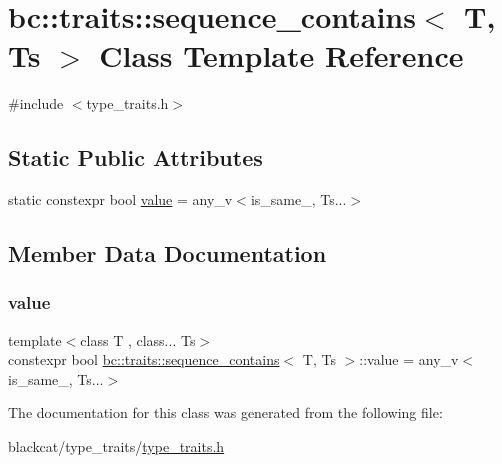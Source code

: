 \hypertarget{classbc_1_1traits_1_1sequence__contains}{}\section{bc\+:\+:traits\+:\+:sequence\+\_\+contains$<$ T, Ts $>$ Class Template Reference}
\label{classbc_1_1traits_1_1sequence__contains}


{\ttfamily \#include $<$type\+\_\+traits.\+h$>$}

\subsection*{Static Public Attributes}
\begin{DoxyCompactItemize}
\item 
static constexpr bool \hyperlink{classbc_1_1traits_1_1sequence__contains_a181feae5078ecb99e06879d037a00201}{value} = any\+\_\+v$<$is\+\_\+same\+\_\+, Ts...$>$
\end{DoxyCompactItemize}


\subsection{Member Data Documentation}
\mbox{\label{classbc_1_1traits_1_1sequence__contains_a181feae5078ecb99e06879d037a00201}} 
\subsubsection{\texorpdfstring{value}{value}}
{\footnotesize\ttfamily template$<$class T , class... Ts$>$ \\
constexpr bool \hyperlink{classbc_1_1traits_1_1sequence__contains}{bc\+::traits\+::sequence\+\_\+contains}$<$ T, Ts $>$\+::value = any\+\_\+v$<$is\+\_\+same\+\_\+, Ts...$>$\hspace{0.3cm}{\ttfamily [static]}}



The documentation for this class was generated from the following file\+:\begin{DoxyCompactItemize}
\item 
blackcat/type\+\_\+traits/\hyperlink{type__traits_2type__traits_8h}{type\+\_\+traits.\+h}\end{DoxyCompactItemize}
